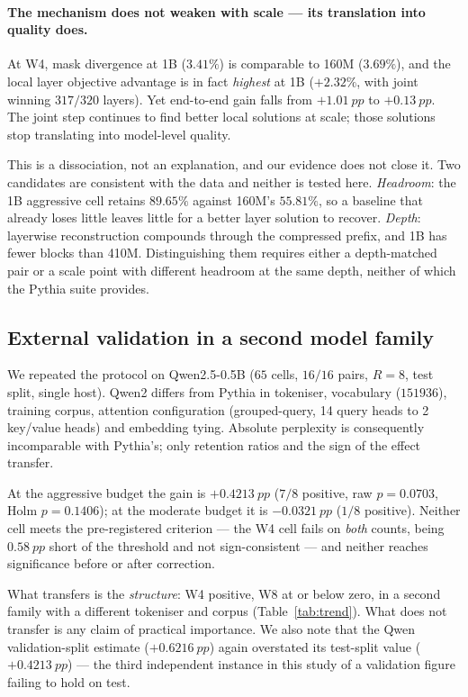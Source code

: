\paragraph{The mechanism does not weaken with scale --- its translation into quality does.}
At W4, mask divergence at 1B ($3.41\%$) is comparable to 160M ($3.69\%$), and the local layer
objective advantage is in fact \emph{highest} at 1B ($+2.32\%$, with joint winning $317/320$
layers). Yet end-to-end gain falls from $+\SI{1.01}{pp}$ to $+\SI{0.13}{pp}$. The joint step
continues to find better local solutions at scale; those solutions stop translating into
model-level quality.

This is a dissociation, not an explanation, and our evidence does not close it. Two candidates
are consistent with the data and neither is tested here. \emph{Headroom}: the 1B aggressive
cell retains $89.65\%$ against 160M's $55.81\%$, so a baseline that already loses little
leaves little for a better layer solution to recover. \emph{Depth}: layerwise reconstruction
compounds through the compressed prefix, and 1B has fewer blocks than 410M. Distinguishing
them requires either a depth-matched pair or a scale point with different headroom at the
same depth, neither of which the Pythia suite provides.

\subsection{External validation in a second model family}
\label{subsec:qwen}

We repeated the protocol on Qwen2.5-0.5B ($65$ cells, $16/16$ pairs, $R{=}8$, test split,
single host). Qwen2 differs from Pythia in tokeniser, vocabulary ($\num{151936}$), training
corpus, attention configuration (grouped-query, 14 query heads to 2 key/value heads) and
embedding tying. Absolute perplexity is consequently incomparable with Pythia's; only
retention ratios and the sign of the effect transfer.

At the aggressive budget the gain is $+\SI{0.4213}{pp}$ ($7/8$ positive, raw $p = 0.0703$,
Holm $p = 0.1406$); at the moderate budget it is $-\SI{0.0321}{pp}$ ($1/8$ positive). Neither
cell meets the pre-registered criterion --- the W4 cell fails on \emph{both} counts, being
$\SI{0.58}{pp}$ short of the threshold and not sign-consistent --- and neither reaches
significance before or after correction.

What transfers is the \emph{structure}: W4 positive, W8 at or below zero, in a second family
with a different tokeniser and corpus (Table~\ref{tab:trend}). What does not transfer is any
claim of practical importance. We also note that the Qwen validation-split estimate
($+\SI{0.6216}{pp}$) again overstated its test-split value ($+\SI{0.4213}{pp}$) --- the third
independent instance in this study of a validation figure failing to hold on test.

